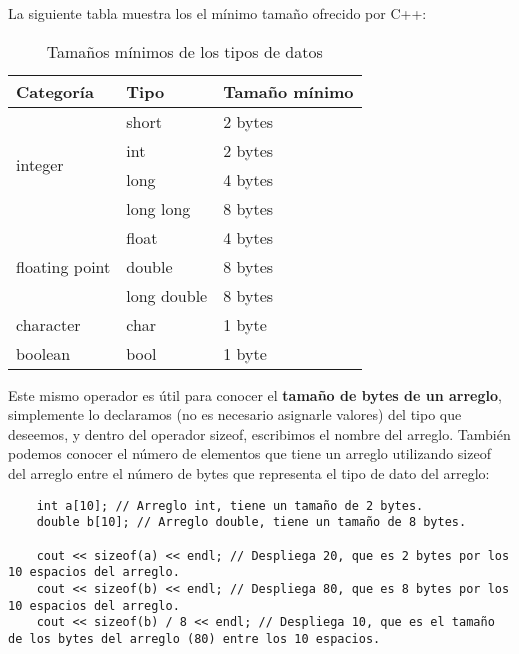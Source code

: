 La siguiente tabla muestra los el mínimo tamaño ofrecido por C++:
\begin{table}[H]
    \begin{center}
        \caption{Tamaños mínimos de los tipos de datos}
        \label{tab: 6}
        \begin{tabular}{m{3cm} m{3cm} m{5cm}}
            \hline
            \textbf{Categoría}&\textbf{Tipo}&\textbf{Tamaño mínimo} \\
            \hline
            \multirow{4}{3cm}{integer}          & short         & 2 bytes \\
                                                & int           & 2 bytes \\
                                                & long          & 4 bytes \\
                                                & long long     & 8 bytes \\
            \multirow{3}{3cm}{floating point}   & float         & 4 bytes \\
                                                & double        & 8 bytes \\
                                                & long double   & 8 bytes \\
            character                           & char          & 1 byte \\
            boolean                             & bool          & 1 byte \\
            \hline
        \end{tabular}
    \end{center}    
\end{table}

Este mismo operador es útil para conocer el \textbf{tamaño de bytes de un arreglo}, simplemente lo declaramos (no es necesario asignarle valores) del tipo que deseemos, y dentro del operador sizeof, escribimos el nombre del arreglo. También podemos conocer el número de elementos que tiene un arreglo utilizando sizeof del arreglo entre el número de bytes que representa el tipo de dato del arreglo:
\begin{lstlisting}
    int a[10]; // Arreglo int, tiene un tamaño de 2 bytes.
    double b[10]; // Arreglo double, tiene un tamaño de 8 bytes.
    
    cout << sizeof(a) << endl; // Despliega 20, que es 2 bytes por los 10 espacios del arreglo.
    cout << sizeof(b) << endl; // Despliega 80, que es 8 bytes por los 10 espacios del arreglo.
    cout << sizeof(b) / 8 << endl; // Despliega 10, que es el tamaño de los bytes del arreglo (80) entre los 10 espacios.
\end{lstlisting}

